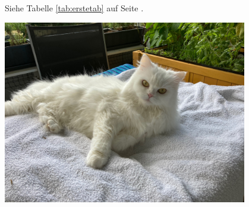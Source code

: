 \documentclass[ngerman]{scrreprt}
\begin{document}
Siehe Tabelle \ref{tab:erstetab} auf Seite \pageref{tab:erstetab}.

\begin{center}
\includegraphics[width=0.8\textwidth]{Bilder/Katze1}
\end{center}
\end{document}
